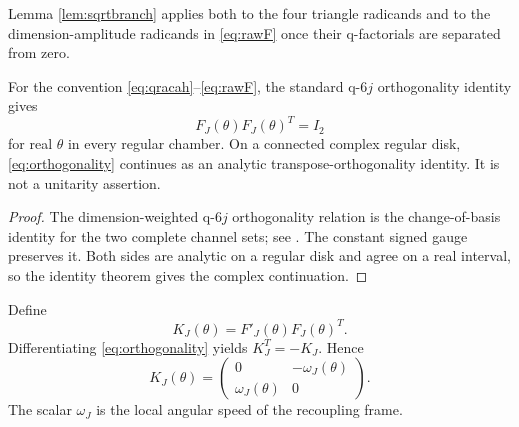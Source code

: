 Lemma \ref{lem:sqrtbranch} applies both to the four triangle radicands and to the dimension-amplitude radicands in \eqref{eq:rawF} once their q-factorials are separated from zero.

\begin{proposition}
\label{prop:orthogonality}
For the convention \eqref{eq:qracah}--\eqref{eq:rawF}, the standard q-$6j$ orthogonality identity gives
\begin{equation}
F_J(\theta)F_J(\theta)^T=I_2
\label{eq:orthogonality}
\end{equation}
for real $\theta$ in every regular chamber.  On a connected complex regular disk, \eqref{eq:orthogonality} continues as an analytic transpose-orthogonality identity.  It is not a unitarity assertion.
\end{proposition}

\begin{proof}
The dimension-weighted q-$6j$ orthogonality relation is the change-of-basis identity for the two complete channel sets; see \cite{kirillovReshetikhin1989,kauffmanLins1994}.  The constant signed gauge preserves it.  Both sides are analytic on a regular disk and agree on a real interval, so the identity theorem gives the complex continuation.
\end{proof}

Define
\begin{equation}
K_J(\theta)=F'_J(\theta)F_J(\theta)^T.
\label{eq:generator}
\end{equation}
Differentiating \eqref{eq:orthogonality} yields $K_J^T=-K_J$.  Hence
\begin{equation}
K_J(\theta)=
\begin{pmatrix}
0&-\omega_J(\theta)\\
\omega_J(\theta)&0
\end{pmatrix}.
\label{eq:omega}
\end{equation}
The scalar $\omega_J$ is the local angular speed of the recoupling frame.
